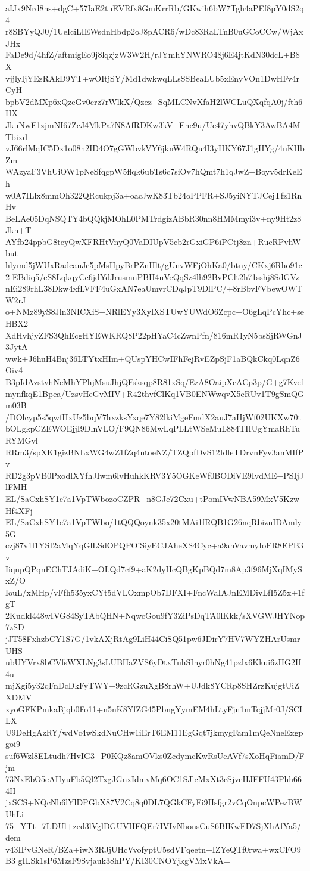 aIJx9Nrd8ns+dgC+57IaE2tuEVRfx8GmKrrRb/GKwih6bW7Tgh4aPEf8pY0dS2q4
r8SBYyQJ0/1UeIciLIEWsdnHbdp2oJ8pACR6/wDc83RaLTnB0uGCoCCw/WjAxJHx
FaDe9d/4hfZ/aftmigEo9j8lqzjzW3W2H/rJYmhYNWRO48j6E4jtKdN30dcL+B8X
vjjlyIjYEzRAkD9YT+wOItjSY/Md1dwkwqLLsSSBeaLUb5xEnyVOn1DwHFv4rCyH
bpbV2dMXp6xQzeGv0crz7rWlkX/Qzez+SqMLCNvXfaH2lWCLuQXqfqA0j/fth6HX
JkuNwE1zjmNI67ZcJ4MkPa7N8AfRDKw3kV+Enc9u/Uc47yhvQBkY3AwBA4MTbixd
vJ66rlMqIC5Dx1o08n2ID4O7gGWbvkVY6jknW4RQu4I3yHKY67J1gHYg/4uKHbZm
WAzyaF3VhUiOW1pNeSfqgpW5flqk6ubTs6c7siOv7hQmt7h1qJwZ+Boyv5drKeEh
w0A7ILlx8mmOh322QRcukpj3a+oacJwK83Tb24oPPFR+SJ5yiNYTJCejTfz1RnHv
BeLAe05DqNSQTY4bQQkjMOhL0PMTrdgizABbR30nn8HMMmyi3v+ny9Ht2z8Jkn+T
AYfb24ppbG8teyQwXFRHtVnyQ0VaDIUpV5cb2rGxiGP6iPCtj8zn+RucRPvhWbut
hlymd5jWUxRadcanJc5pMsHpyBrPZnHlt/gUnvWFjOhKa0/btny/CKxj6Rho91c2
EBdiq5/eS8LqkqyCc6jdYdJrusmnPBH4uVeQqSz4lh92BvPClt2h71sshj8SdGVz
nEi289rhL38Dkw4xfLVFF4uGxAN7eaUmvrCDqJpT9DlPC/+8rBbvFVbewOWTW2rJ
o+NMz89yS8Jln3NICXiS+NRlEYy3XylXSTUwYUWdO6Zcpc+O6gLqPcYhc+seHBX2
XdHvhjyZFS3QhEcgHYEWKRQ8P22pHYaC4cZwnPfn/816mR1yN5bsSjRWGnJ3JytA
wwk+J6huH4Bnj36LTYtxHIm+QUspYHCwIFhFejRvEZpSjF1aBQkCkq0LqnZ6Oiv4
B3pIdAzstvhNeMhYPhjMsuJhjQFsksqp8R81xSq/EzA8OaipXcACp3p/G+g7Kve1
mynfkqE1Bpea/UzsvHeGvMIV+R42thvfClKq1VB0ENWwqvX5eRUv1T9gSmQGm03B
/DOlcyp5s5qwfHxUz5bqV7hxzksYxqe7Y82lkiMgeFmdX2auJ7aHjWf02UKXw70t
bOLgkpCZEWOEjjI9DlnVLO/F9QN86MwLqPLLtWSeMuL884TIIUgYmaRhTuRYMGvl
RRm3/spXK1gizBNLxWG4wZ1fZq4ntoeNZ/TZQpfDvS12IdleTDrvnFyv3anMIfPv
RD2g3pVB0PxodlXYfhJIwm6lvHuhkKRV3Y5OGKeWf0BODiVE9IvdME+PSIjJlFMH
EL/SaCxhSY1c7a1VpTWbozoCZPR+n8GJe72Cxu+tPomIVwNBA59MxV5KzwHf4XFj
EL/SaCxhSY1c7a1VpTWbo/1tQQQoynk35x20tMAi1fRQB1G26nqRbiznIDAmly5G
czj87v1l1YSI2aMqYqGlLSdOPQPOiSiyECJAheXS4Cyc+a9ahVavmyIoFR8EPB3v
IiqnpQPqnEChTJAdiK+OLQd7cf9+aK2dyHcQBgKpBQd7m8Ap3f96MjXqIMySxZ/O
IouL/xMHp/vFfh535yxCYt5dVLOxmpOb7DFXI+FncWaIAJnEMDivLfI5Z5x+1fgT
2Kudkl448wIVG84SyTAbQHN+NqwcGou9fY3ZiPsDqTA0lKkk/sXVGWJHYNop7zSD
jJT58FxhzbCY1S7G/1vkAXjRtAg9LiH44CiSQ51pw6JDirY7HV7WYZHArUsmrUHS
ubUYVrx8bCVfsWXLNg3sLUBHaZVS6yDtxTuhSInyr0hNg41pzlx6Kkui6zHG2H4u
mjXgi5y32qFnDcDkFyTWY+9zcRGzuXgB8rhW+UJdk8YCRp8SHZrzKujgtUiZXDMV
xyoGFKPmkaBjqb0Fo11+n5nK8YfZG45PbngYymEM4hLtyFjn1mTcjjMr0J/SCILX
U9DeHgAzRY/wdVc4wSkdNuCHw1iErT6EM11EgGqt7jkmygFam1mQeNneExgpgoi9
suf6Wzl8ELtudh7HvIG3+P0KQz8amOVks0ZcdymcKwRsUeAVf7sXoHqFiamD/Fjm
73NxEbO5eAHyuFb5Ql2TxgJGnxIdmvMq6OC1SJlcMxXt3cSjveHJFFU43Phh664H
jxSCS+NQcNb6lYlDPGbX87V2Cq8q0DL7QGkCFyFi9Hsfgr2vCqOnpcWPezBWUhLi
75+YTt+7LDUl+zed3lVglDGUVHFQEr7IVIvNhonsCuS6BIKwFD7SjXhAfYa5/dem
v43IPvGNeR/BZa+iwN3RJjUHcVvofyptU5sdVFqeetn+IZYeQTf0rwa+wxCFO9B3
gILSk1sP6MzsF9Svjauk38hPY/KI30CNOYjkgVMxVkA=
